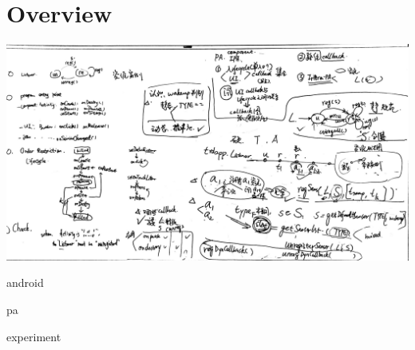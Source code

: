 \documentclass{article}
\begin{document}
\tableofcontents

\section{Overview}




\includegraphics[width=\linewidth]{img/overview_11Apr}

{android}

{pa}

{experiment}
\end{document}
